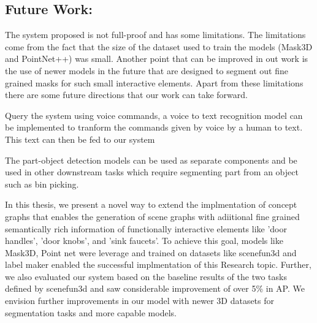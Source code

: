 \subsection{Future Work:}
The system proposed is not full-proof and has some limitations. The limitations come from the fact that the size of the dataset used to train the models (Mask3D 
and PointNet++) was small. Another point that can be improved in out work is the use of newer models in the future that are designed to segment out fine grained masks
for such small interactive elements. Apart from these limitations there are some future directions that our work can take forward.
\begin{compactenum}[1.]
    \item	Query the system using voice commands, a voice to text recognition model can be implemented to tranform the commands given by voice by a human to text. This text can then be fed to our system
    \item	The part-object detection models can be used as separate components and be used in other downstream tasks which require segmenting part from an object such as bin picking.
    \end{compactenum}
In this thesis, we present a novel way to extend the implmentation of concept graphs that enables the generation of scene graphs with adiitional fine grained 
semantically rich information of functionally interactive elements like 'door handles', 'door knobs', and 'sink faucets'. To achieve this goal, models like Mask3D,
Point net were leverage and trained on datasets like scenefun3d and label maker enabled the successful implmentation of this Research topic. Further, we also evaluated 
our system based on the baseline results of the two tasks defined by scenefun3d and saw considerable improvement of over 5\% in AP. We envision further improvements in
our model with newer 3D datasets for segmentation tasks and more capable models. 

